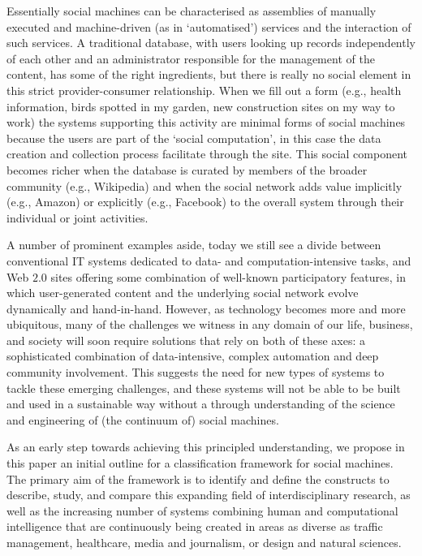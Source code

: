 \documentclass{sig-alternate}
\begin{document}
Essentially social machines can be characterised as assemblies of manually executed and machine-driven (as in `automatised') services and the interaction of such services. A traditional database, with users looking up records independently of each other and an administrator responsible for the management of the content, has some of the right ingredients, but there is really no social element in this strict provider-consumer relationship. When we fill out a form (e.g., health information, birds spotted in my garden, new construction sites on my way to work) the systems supporting this activity are minimal forms of social machines because the users are part of the `social computation', in this case the data creation and collection process facilitate through the site. This social component becomes richer when the database is curated by members of the broader community (e.g., Wikipedia) and when the social network adds value implicitly (e.g., Amazon) or explicitly (e.g., Facebook) to the overall system through their individual or joint activities.

A number of prominent examples aside, today we still see a divide between conventional IT systems dedicated to data- and computation-intensive tasks, and Web $2.0$ sites offering some combination of well-known participatory features, in which user-generated content and the underlying social network evolve dynamically and hand-in-hand. However, as technology becomes more and more ubiquitous, many of the challenges we witness in any domain of our life, business, and society will soon require solutions that rely on both of these axes: a sophisticated combination of data-intensive, complex automation and deep community involvement. This suggests the need for new types of systems to tackle these emerging challenges, and these systems will not be able to be built and used in a sustainable way without a through understanding of the science and engineering of (the continuum of) social machines.

As an early step towards achieving this principled understanding, we propose in this paper an initial outline for a classification framework for social machines. The primary aim of the framework is to identify and define the constructs to describe, study, and compare this expanding field of interdisciplinary research, as well as the increasing number of systems combining human and computational intelligence that are continuously being created in areas as diverse as traffic management, healthcare, media and journalism, or design and natural sciences.
\end{document}
